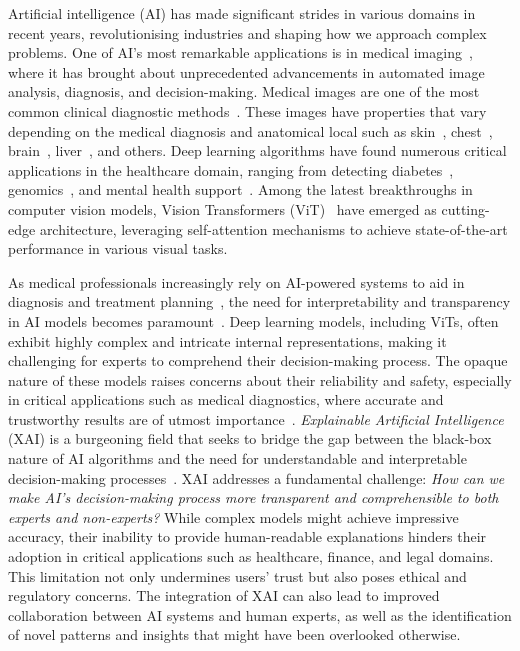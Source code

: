\documentclass[dvipsnames]{article}
\renewcommand{\cite}[1]{\autocite{#1}}
\begin{document}
Artificial intelligence (AI) has made significant strides in various domains in recent years, revolutionising industries and shaping how we approach complex problems.
One of AI's most remarkable applications is in medical imaging~\cite{esteva2021deep}, where it has brought about unprecedented advancements in automated image analysis, diagnosis, and decision-making.
Medical images are one of the most common clinical diagnostic methods~\cite{shung2012principles}.
These images have properties that vary depending on the medical diagnosis and anatomical local such as skin~\cite{hu2022x,lucieri2022exaid,stieler2021skinimage,lucieri2020interpretability},
chest~\cite{lenis2020domain,hu2022x,brunese2020explainable,corizzo2021explainable,mondal2021xvitcos},
brain~\cite{bang2021spatio,li2021explainable}, liver~\cite{MOHAGHEGHI2022105106}, and others.
Deep learning algorithms have found numerous critical applications in the healthcare domain, ranging from detecting diabetes~\cite{sensorsMLforDiabetes}, genomics~\cite{Yang2021review}, and mental health support~\cite{lai2023psyllm}.
Among the latest breakthroughs in computer vision models, Vision Transformers (ViT)~\cite{dosovitskiy2020image} have emerged as cutting-edge architecture, leveraging self-attention mechanisms to achieve state-of-the-art performance in various visual tasks.


As medical professionals increasingly rely on AI-powered systems to aid in diagnosis and treatment planning~\cite{ker2017deep}, the need for interpretability and transparency in AI models becomes paramount~\cite{macdonald2022interpretable}.
Deep learning models, including ViTs, often exhibit highly complex and intricate internal representations, making it challenging for experts to comprehend their decision-making process.
The opaque nature of these models raises concerns about their reliability and safety, especially in critical applications such as medical diagnostics, where accurate and trustworthy results are of utmost importance~\cite{ghosh2020interpretable}.
\emph{Explainable Artificial Intelligence} (XAI) is a burgeoning field that seeks to bridge the gap between the black-box nature of AI algorithms and the need for understandable and interpretable decision-making processes~\cite{arrieta2020explainable}.
XAI addresses a fundamental challenge: \emph{How can we make AI's decision-making process more transparent and comprehensible to both experts and non-experts?}
While complex models might achieve impressive accuracy, their inability to provide human-readable explanations hinders their adoption in critical applications such as healthcare, finance, and legal domains. This limitation not only undermines users' trust but also poses ethical and regulatory concerns.
The integration of XAI can also lead to improved collaboration between AI systems and human experts, as well as the identification of novel patterns and insights that might have been overlooked otherwise.
\end{document}
